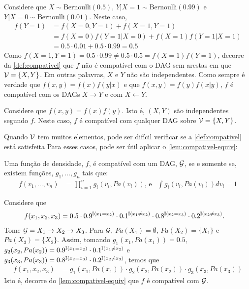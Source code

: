 \begin{example}
 \label{ex:compativel_1}
 Considere que $X \sim \text{Bernoulli}(0.5)$,
 $Y|X = 1 \sim \text{Bernoulli}(0.99)$ e
 $Y|X = 0 \sim \text{Bernoulli}(0.01)$.
 Neste caso,
 \begin{align*}
  f(Y=1) 
  &= f(X=0,Y=1) + f(X=1,Y=1) \\
  &= f(X=0)f(Y=1|X=0) + f(X=1)f(Y=1|X=1) \\
  &= 0.5 \cdot 0.01 + 0.5 \cdot 0.99 = 0.5
 \end{align*}
 Como $f(X=1,Y=1) = 0.5 \cdot 0.99 \neq 0.5 \cdot 0.5 = f(X=1)f(Y=1)$,
 decorre da \cref{def:compativel} que
 $f$ não é compatível com o DAG sem arestas em que ${\mathcal V} = \{X,Y\}$.
 Em outras palavras, $X$ e $Y$ não são independentes.
 Como sempre é verdade que $f(x,y) = f(x)f(y|x)$ e que
 $f(x,y) = f(y)f(x|y)$, 
 $f$ é compatível com os DAGs 
 $X \rightarrow Y$ e com $X \leftarrow Y$.
\end{example}

\begin{example}
 \label{ex:compativel_2}
 Considere que $f(x,y) = f(x)f(y)$.
 Isto é, $(X,Y)$ são independentes segundo $f$.
 Neste caso, $f$ é compatível com qualquer DAG 
 sobre ${\mathcal V} = \{X,Y\}$.
\end{example}

Quando ${\mathcal V}$ tem muitos elementos, 
pode ser difícil verificar 
se a \cref{def:compativel} está satisfeita 
Para esses casos,
pode ser útil aplicar o 
\cref{lem:compativel-equiv}:

\begin{lemma}
 \label{lem:compativel-equiv}
 Uma função de densidade, $f$, é
 compatível com um DAG, ${\mathcal G}$,
 se e somente se, existem funções,
 $g_1,\ldots,g_n$ tais que:
 \begin{align*}
  f(v_1,\ldots,v_n)
  &= \prod_{i=1}^n g_i(v_i, Pa(v_i)) \text{, e}
  & \int g_i(v_i, Pa(v_i)) dv_i = 1
 \end{align*}
\end{lemma}

\begin{example}
 \label{ex:compativel_3}
 Considere que 
 \begin{align*}
  f(x_1,x_2,x_3) &= 0.5 \cdot 0.9^{{\mathbb I}(x_1 = x_2)} \cdot 0.1^{{\mathbb I}(x_1 \neq x_2)} 
  \cdot 0.8^{{\mathbb I}(x_2 = x_3)} \cdot 0.2^{{\mathbb I}(x_2 \neq x_3)}.
 \end{align*}
 Tome ${\mathcal G} = X_1 \rightarrow X_2 \rightarrow X_3$. Para ${\mathcal G}$,
 $Pa(X_1) = \emptyset$, $Pa(X_2) = \{X_1\}$ e $Pa(X_3) = \{X_2\}$.
 Assim, tomando $g_1(x_1, Pa(x_1)) = 0.5$,
 $g_2(x_2, Pa(x_2)) = 0.9^{{\mathbb I}(x_1 = x_2)} \cdot 0.1^{{\mathbb I}(x_1 \neq x_2)}$ e
 $g_3(x_3, Pa(x_3)) = 0.8^{{\mathbb I}(x_2 = x_3)} \cdot 0.2^{{\mathbb I}(x_2 \neq x_3)}$,
 temos que
 \begin{align*}
  f(x_1,x_2,x_3)
  &= g_1(x_1, Pa(x_1)) \cdot g_2(x_2, Pa(x_2)) \cdot g_3(x_3, Pa(x_3))
 \end{align*}
 Isto é, decorre do \cref{lem:compativel-equiv} que
 $f$ é compatível com ${\mathcal G}$.
\end{example}

